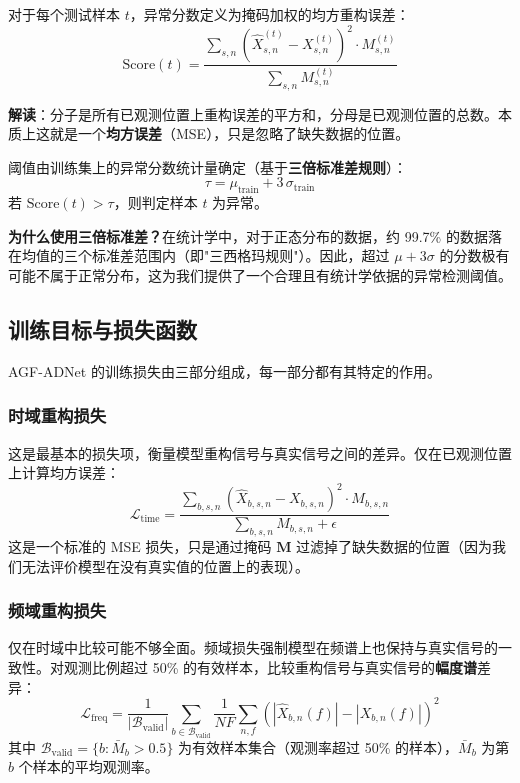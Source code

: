 \documentclass[UTF8]{ctexart}
\begin{document}
对于每个测试样本 $t$，异常分数定义为掩码加权的均方重构误差：
\begin{equation}
    \mathrm{Score}(t) = \frac{\sum_{s,n} \left(\hat{X}_{s,n}^{(t)} - X_{s,n}^{(t)}\right)^2 \cdot M_{s,n}^{(t)}}{\sum_{s,n} M_{s,n}^{(t)}}
\end{equation}

\textbf{解读}：分子是所有已观测位置上重构误差的平方和，分母是已观测位置的总数。本质上这就是一个\textbf{均方误差}（MSE），只是忽略了缺失数据的位置。

阈值由训练集上的异常分数统计量确定（基于\textbf{三倍标准差规则}）：
\begin{equation}
    \tau = \mu_{\text{train}} + 3 \, \sigma_{\text{train}}
\end{equation}
若 $\mathrm{Score}(t) > \tau$，则判定样本 $t$ 为异常。

\textbf{为什么使用三倍标准差？}在统计学中，对于正态分布的数据，约 99.7\% 的数据落在均值的三个标准差范围内（即"三西格玛规则"）。因此，超过 $\mu + 3\sigma$ 的分数极有可能不属于正常分布，这为我们提供了一个合理且有统计学依据的异常检测阈值。

\subsection{训练目标与损失函数}

AGF-ADNet 的训练损失由三部分组成，每一部分都有其特定的作用。

\subsubsection{时域重构损失}

这是最基本的损失项，衡量模型重构信号与真实信号之间的差异。仅在已观测位置上计算均方误差：
\begin{equation}
    \mathcal{L}_{\text{time}} = \frac{\sum_{b,s,n} \left(\hat{X}_{b,s,n} - X_{b,s,n}\right)^2 \cdot M_{b,s,n}}{\sum_{b,s,n} M_{b,s,n} + \epsilon}
\end{equation}
这是一个标准的 MSE 损失，只是通过掩码 $\mathbf{M}$ 过滤掉了缺失数据的位置（因为我们无法评价模型在没有真实值的位置上的表现）。

\subsubsection{频域重构损失}

仅在时域中比较可能不够全面。频域损失强制模型在频谱上也保持与真实信号的一致性。对观测比例超过 50\% 的有效样本，比较重构信号与真实信号的\textbf{幅度谱}差异：
\begin{equation}
    \mathcal{L}_{\text{freq}} = \frac{1}{|\mathcal{B}_{\text{valid}}|} \sum_{b \in \mathcal{B}_{\text{valid}}} \frac{1}{NF} \sum_{n,f} \left(|\hat{X}_{b,n}(f)| - |X_{b,n}(f)|\right)^2
\end{equation}
其中 $\mathcal{B}_{\text{valid}} = \{b : \bar{M}_b > 0.5\}$ 为有效样本集合（观测率超过 50\% 的样本），$\bar{M}_b$ 为第 $b$ 个样本的平均观测率。
\end{document}
